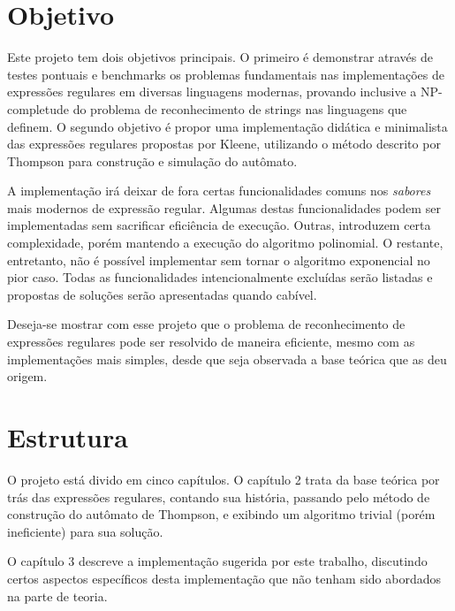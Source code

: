 \documentclass[a4paper,12pt,oneside,onecolumn]{uerj}
\begin{document}
\section{Objetivo}

Este projeto tem dois objetivos principais. O primeiro é demonstrar através de testes pontuais e benchmarks os problemas fundamentais nas implementações de expressões regulares em diversas linguagens modernas, provando inclusive a NP-completude do problema de reconhecimento de strings nas linguagens que definem. O segundo objetivo é propor uma implementação didática e minimalista das expressões regulares propostas por Kleene, utilizando o método descrito por Thompson para construção e simulação do autômato. 

A implementação irá deixar de fora certas funcionalidades comuns nos \emph{sabores} mais modernos de expressão regular. Algumas destas funcionalidades podem ser implementadas sem sacrificar eficiência de execução. Outras, introduzem certa complexidade, porém mantendo a execução do algoritmo polinomial. O restante, entretanto, não é possível implementar sem tornar o algoritmo exponencial no pior caso. Todas as funcionalidades intencionalmente excluídas serão listadas e propostas de soluções serão apresentadas quando cabível.

Deseja-se mostrar com esse projeto que o problema de reconhecimento de expressões regulares pode ser resolvido de maneira eficiente, mesmo com as implementações mais simples, desde que seja observada a base teórica que as deu origem.

\section{Estrutura}

O projeto está divido em cinco capítulos. O capítulo 2 trata da base teórica por trás das expressões regulares, contando sua história, passando pelo método de construção do autômato de Thompson, e exibindo um algoritmo trivial (porém ineficiente) para sua solução.

O capítulo 3 descreve a implementação sugerida por este trabalho, discutindo certos aspectos específicos desta implementação que não tenham sido abordados na parte de teoria. 
\end{document}
